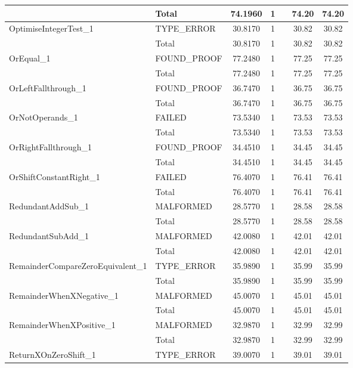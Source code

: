 \begin{appendices}
\begin{longtable}{L{0.25\textwidth} L{0.2\textwidth}  c  c  c  c  c }
    & Total & 74.1960 & 1 &  & 74.20 & 74.20 \\ \midrule 
    OptimiseIntegerTest\_1 & TYPE\_ERROR & 30.8170 & 1 &  & 30.82 & 30.82 \\ \midrule 
    & Total & 30.8170 & 1 &  & 30.82 & 30.82 \\ \midrule 
    OrEqual\_1 & FOUND\_PROOF & 77.2480 & 1 &  & 77.25 & 77.25 \\ \midrule 
    & Total & 77.2480 & 1 &  & 77.25 & 77.25 \\ \midrule 
    OrLeftFallthrough\_1 & FOUND\_PROOF & 36.7470 & 1 &  & 36.75 & 36.75 \\ \midrule 
    & Total & 36.7470 & 1 &  & 36.75 & 36.75 \\ \midrule 
    OrNotOperands\_1 & FAILED & 73.5340 & 1 &  & 73.53 & 73.53 \\ \midrule 
    & Total & 73.5340 & 1 &  & 73.53 & 73.53 \\ \midrule 
    OrRightFallthrough\_1 & FOUND\_PROOF & 34.4510 & 1 &  & 34.45 & 34.45 \\ \midrule 
    & Total & 34.4510 & 1 &  & 34.45 & 34.45 \\ \midrule 
    OrShiftConstantRight\_1 & FAILED & 76.4070 & 1 &  & 76.41 & 76.41 \\ \midrule 
    & Total & 76.4070 & 1 &  & 76.41 & 76.41 \\ \midrule 
    RedundantAddSub\_1 & MALFORMED & 28.5770 & 1 &  & 28.58 & 28.58 \\ \midrule 
    & Total & 28.5770 & 1 &  & 28.58 & 28.58 \\ \midrule 
    RedundantSubAdd\_1 & MALFORMED & 42.0080 & 1 &  & 42.01 & 42.01 \\ \midrule 
    & Total & 42.0080 & 1 &  & 42.01 & 42.01 \\ \midrule 
    RemainderCompareZeroEquivalent\_1 & TYPE\_ERROR & 35.9890 & 1 &  & 35.99 & 35.99 \\ \midrule 
    & Total & 35.9890 & 1 &  & 35.99 & 35.99 \\ \midrule 
    RemainderWhenXNegative\_1 & MALFORMED & 45.0070 & 1 &  & 45.01 & 45.01 \\ \midrule 
    & Total & 45.0070 & 1 &  & 45.01 & 45.01 \\ \midrule 
    RemainderWhenXPositive\_1 & MALFORMED & 32.9870 & 1 &  & 32.99 & 32.99 \\ \midrule 
    & Total & 32.9870 & 1 &  & 32.99 & 32.99 \\ \midrule 
    ReturnXOnZeroShift\_1 & TYPE\_ERROR & 39.0070 & 1 &  & 39.01 & 39.01 \\ \midrule 

\end{longtable}
\end{appendices}

